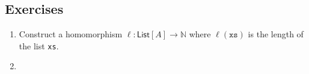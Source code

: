 
\subsection{Exercises}

\begin{enumerate}

    \item Construct a homomorphism $\ell:\mathsf{List}[A]\to \mathbb{N}$ where 
    $\ell(\mathtt{xs})$ is the length of the list \texttt{xs}.

    \item 
\end{enumerate}